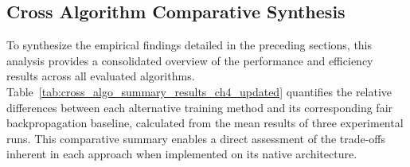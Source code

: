 \subsection{Cross Algorithm Comparative Synthesis}
\label{sec:exp_cross_algo_summary_ch4}

To synthesize the empirical findings detailed in the preceding sections, this analysis provides a consolidated overview of the performance and efficiency results across all evaluated algorithms. Table~\ref{tab:cross_algo_summary_results_ch4_updated} quantifies the relative differences between each alternative training method and its corresponding fair backpropagation baseline, calculated from the mean results of three experimental runs. This comparative summary enables a direct assessment of the trade-offs inherent in each approach when implemented on its native architecture.

